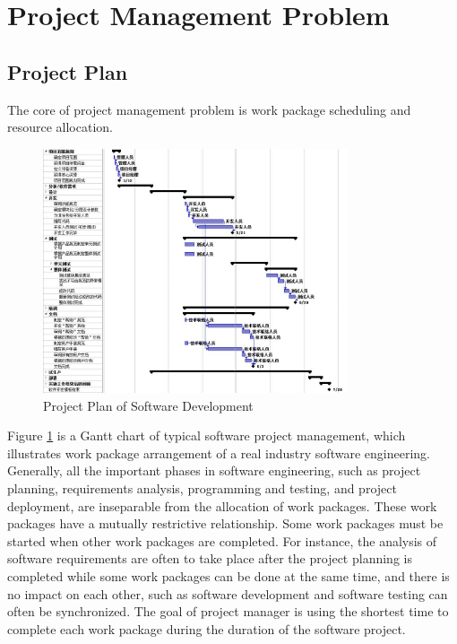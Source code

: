 
\section{Project Management Problem}
%

\subsection{Project Plan}
%

The core of project management problem is work package scheduling and resource
allocation.

\begin{figure}[!ht]
  \centering
  \includegraphics[width=0.8\textwidth]{figures/pm_sample.jpg}
  \caption{Project Plan of Software Development}
  \label{fig:sample}
\end{figure}


Figure \ref{fig:sample} is a Gantt chart of typical software project management, which
illustrates work package arrangement of a real industry software engineering.
Generally, all the important phases in software engineering, such as project
planning, requirements analysis, programming and testing, and project
deployment, are inseparable from the allocation of work packages.  These work
packages have a mutually restrictive relationship. Some work packages must be
started when other work packages are completed. For instance, the analysis of
software requirements are often to take place after the project planning is
completed while some work packages can be done at the same time, and there is no
impact on each other, such as software development and software testing can
often be synchronized.  The goal of project manager is using the shortest time
to complete each work package during the duration of the software project.


